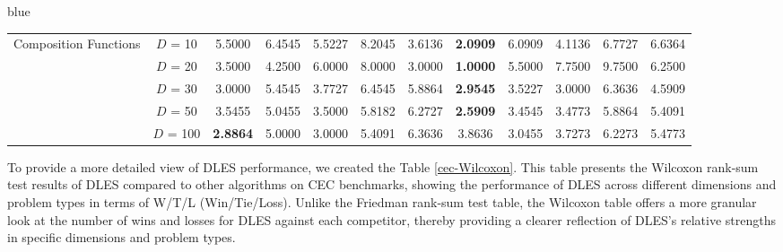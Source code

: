 \documentclass[journal, onecolumn]{IEEEtran}
\begin{document}
\begin{color}{blue}
\begin{table}[h]
{\begin{tabular}{l|c|ccc|ccccccc}
			\multirow{5}{*}{Composition Functions}	
			& $D$ =  10  &  5.5000 & 6.4545 & 5.5227 & 8.2045 & 3.6136 & \textbf{2.0909} & 6.0909 & 4.1136 & 6.7727 & 6.6364 \\
			& $D$ =  20  &  3.5000 & 4.2500 & 6.0000 & 8.0000 & 3.0000 & \textbf{1.0000} & 5.5000 & 7.7500 & 9.7500 & 6.2500 \\
			& $D$ =  30  &  3.0000 & 5.4545 & 3.7727 & 6.4545 & 5.8864 & \textbf{2.9545} & 3.5227 & 3.0000 & 6.3636 & 4.5909 \\
			& $D$ =  50  &  3.5455 & 5.0455 & 3.5000 & 5.8182 & 6.2727 & \textbf{2.5909} & 3.4545 & 3.4773 & 5.8864 & 5.4091 \\
			& $D$ =  100  &  \textbf{2.8864} & 5.0000 & 3.0000 & 5.4091 & 6.3636 & 3.8636 & 3.0455 & 3.7273 & 6.2273 & 5.4773 \\
			\hline																						\end{tabular}
		\vspace{-2mm}
	}
\end{table}

To provide a more detailed view of DLES performance, we created the Table \ref{cec-Wilcoxon}. This table presents the Wilcoxon rank-sum test results of DLES compared to other algorithms on CEC benchmarks, showing the performance of DLES across different dimensions and problem types in terms of W/T/L (Win/Tie/Loss). Unlike the Friedman rank-sum test table, the Wilcoxon table offers a more granular look at the number of wins and losses for DLES against each competitor, thereby providing a clearer reflection of DLES's relative strengths in specific dimensions and problem types.


\end{color}
\end{document}
